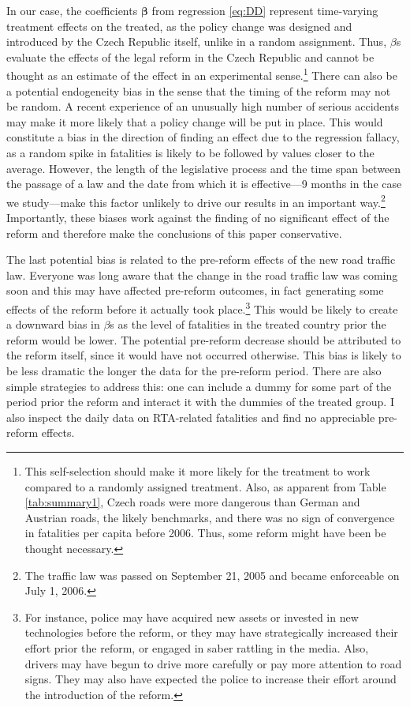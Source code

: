 \documentclass[12pt]{article}
\begin{document}
In our case, the coefficients $\boldsymbol{\beta}$ from regression \ref{eq:DD}
represent time-varying treatment effects on the treated, as the policy change
was designed and introduced by the Czech Republic itself, unlike in a random
assignment. Thus, $\beta$s evaluate the effects of the legal reform in the Czech
Republic and cannot be thought as an estimate of the effect in an experimental
sense.\footnote{This self-selection should make it more likely for the treatment
  to work compared to a randomly assigned treatment.  Also, as apparent from
  Table \ref{tab:summary1}, Czech roads were more dangerous than German and
  Austrian roads, the likely benchmarks, and there was no sign of convergence in
  fatalities per capita before 2006. Thus, some reform might have been be
  thought necessary.} There can also be a potential endogeneity bias in the
sense that the timing of the reform may not be random. A recent experience of an
unusually high number of serious accidents may make it more likely that a policy
change will be put in place. This would constitute a bias in the direction of
finding an effect due to the regression fallacy, as a random spike in fatalities
is likely to be followed by values closer to the average. However, the length of
the legislative process and the time span between the passage of a law and the
date from which it is effective---9 months in the case we study---make this
factor unlikely to drive our results in an important way.\footnote{The traffic
  law was passed on September 21, 2005 and became enforceable on July 1, 2006.}
Importantly, these biases work against the finding of no significant effect of
the reform and therefore make the conclusions of this paper conservative. 

The last potential bias is related to the pre-reform effects of the new road
traffic law.  Everyone was long aware that the change in the road traffic law
was coming soon and this may have affected pre-reform outcomes, in fact
generating some effects of the reform before it actually took
place.\footnote{For instance, police may have acquired new assets or invested in
  new technologies before the reform, or they may have strategically increased
  their effort prior the reform, or engaged in saber rattling in the media.
  Also, drivers may have begun to drive more carefully or pay more attention to
  road signs. They may also have expected the police to increase their effort
  around the introduction of the reform.} This would be likely to create a
downward bias in $\beta$s as the level of fatalities in the treated country
prior the reform would be lower. The potential pre-reform decrease should be
attributed to the reform itself, since it would have not occurred otherwise.
This bias is likely to be less dramatic the longer the data for the pre-reform
period.  There are also simple strategies to address this: one can include a
dummy for some part of the period prior the reform and interact it with the
dummies of the treated group. I also inspect the daily data on RTA-related
fatalities and find no appreciable pre-reform effects.
\end{document}
